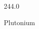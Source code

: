 \documentclass[12pt]{article}
\begin{document}
\hfill{}
\vfill
\begin{center}
  {\fontsize{50}{60}
  }

  244.0

Plutonium
\end{center}
\vfill
\end{document}
